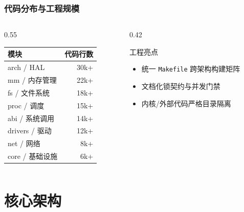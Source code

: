 \documentclass[aspectratio=1610]{beamer}
\newcommand{\code}[1]{\texttt{\footnotesize #1}}
\begin{document}
\begin{frame}
    \frametitle{代码分布与工程规模}
    \begin{columns}
        \begin{column}{0.55\textwidth}
            \begin{table}
                \centering
                \footnotesize
                \renewcommand{\arraystretch}{1.2}
                \begin{tabular}{lr}
                    \toprule
                    \textbf{模块} & \textbf{代码行数} \\
                    \midrule
                    arch / HAL & 30k+ \\
                    mm / 内存管理 & 22k+ \\
                    fs / 文件系统 & 18k+ \\
                    proc / 调度 & 15k+ \\
                    abi / 系统调用 & 14k+ \\
                    drivers / 驱动 & 12k+ \\
                    net / 网络 & 8k+ \\
                    core / 基础设施 & 6k+ \\
                    \bottomrule
                \end{tabular}
            \end{table}
        \end{column}
        \begin{column}{0.42\textwidth}
            \begin{block}{工程亮点}
                \begin{itemize}
                    \item 统一 \code{Makefile} 跨架构构建矩阵
                    \item 文档化锁契约与并发门禁
                    \item 内核/外部代码严格目录隔离
                \end{itemize}
            \end{block}
        \end{column}
    \end{columns}
\end{frame}

\section{核心架构}
\end{document}
